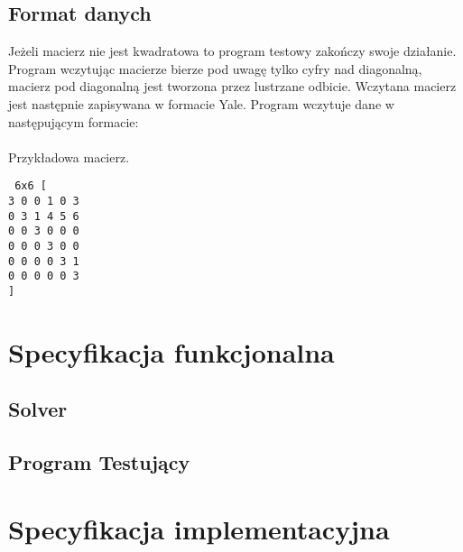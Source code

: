 \documentclass[bibtotocnumbered, headsepline,normalheadings,12pt,polish]{scrreprt}
\begin{document}
\section{Format danych}
\normalsize
Jeżeli macierz nie jest kwadratowa to program testowy zakończy swoje działanie. Program wczytując macierze bierze pod uwagę tylko cyfry nad diagonalną, macierz pod diagonalną jest tworzona przez lustrzane odbicie. Wczytana macierz jest następnie zapisywana w formacie Yale.
Program wczytuje dane w następującym formacie:\\ \\
Przykładowa macierz.
\small
\begin{verbatim}
 6x6 [
3 0 0 1 0 3
0 3 1 4 5 6
0 0 3 0 0 0
0 0 0 3 0 0
0 0 0 0 3 1
0 0 0 0 0 3
]
\end{verbatim}



\chapter{Specyfikacja funkcjonalna}
\section{Solver}
\small
{}

\section{Program Testujący}
\small
{}

\chapter{Specyfikacja implementacyjna}
\end{document}
